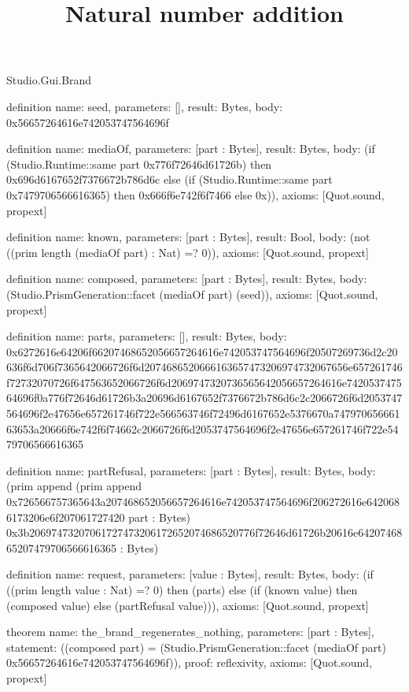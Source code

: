 \begin{lexlean}{Studio.Gui.Brand}
\title{Natural number addition}
\begin{semanticmodule}
definition{
  name: seed,
  parameters: [],
  result: Bytes,
  body: 0x56657264616e742053747564696f
}

definition{
  name: mediaOf,
  parameters: [part : Bytes],
  result: Bytes,
  body: (if (Studio.Runtime::same part 0x776f72646d61726b) then 0x696d6167652f7376672b786d6c else (if (Studio.Runtime::same part 0x7479706566616365) then 0x666f6e742f6f7466 else 0x)),
  axioms: [Quot.sound, propext]
}

definition{
  name: known,
  parameters: [part : Bytes],
  result: Bool,
  body: (not ((prim length (mediaOf part) : Nat) =? 0)),
  axioms: [Quot.sound, propext]
}

definition{
  name: composed,
  parameters: [part : Bytes],
  result: Bytes,
  body: (Studio.PrismGeneration::facet (mediaOf part) (seed)),
  axioms: [Quot.sound, propext]
}

definition{
  name: parts,
  parameters: [],
  result: Bytes,
  body: 0x6272616e64206f66207468652056657264616e742053747564696f20507269736d2c20636f6d706f7365642066726f6d2074686520666163657473206974732067656e657261746f72732070726f647563652066726f6d2069747320736565642056657264616e742053747564696f0a776f72646d61726b3a20696d6167652f7376672b786d6c2c2066726f6d2053747564696f2e47656e657261746f722e566563746f72496d6167652e5376670a74797065666163653a20666f6e742f6f74662c2066726f6d2053747564696f2e47656e657261746f722e5479706566616365
}

definition{
  name: partRefusal,
  parameters: [part : Bytes],
  result: Bytes,
  body: (prim append (prim append 0x726566757365643a207468652056657264616e742053747564696f206272616e6420686173206e6f207061727420 part : Bytes) 0x3b20697473207061727473206172652074686520776f72646d61726b20616e6420746865207479706566616365 : Bytes)
}

definition{
  name: request,
  parameters: [value : Bytes],
  result: Bytes,
  body: (if ((prim length value : Nat) =? 0) then (parts) else (if (known value) then (composed value) else (partRefusal value))),
  axioms: [Quot.sound, propext]
}

theorem{
  name: the_brand_regenerates_nothing,
  parameters: [part : Bytes],
  statement: ((composed part) = (Studio.PrismGeneration::facet (mediaOf part) 0x56657264616e742053747564696f)),
  proof: reflexivity{},
  axioms: [Quot.sound, propext]
}


\end{semanticmodule}
\end{lexlean}
